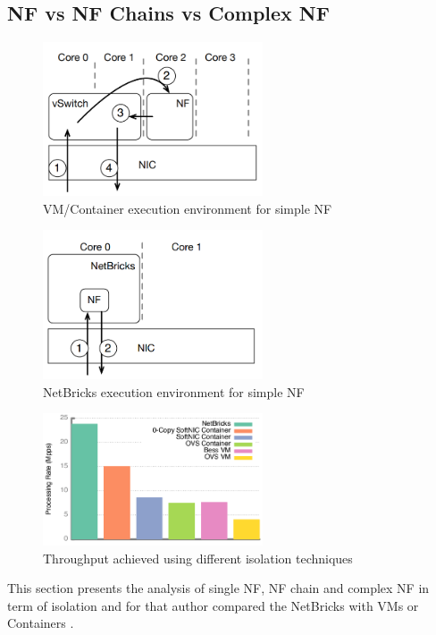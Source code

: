 \documentclass[10pt, a4paper, conference]{IEEEtran}
\begin{document}
\subsection*{NF vs NF Chains vs Complex NF}
\begin{figure}
	\centering
	\includegraphics[width=65mm]{figures/fig6}
	\caption{VM/Container execution environment for simple NF\cite{Panda2016}}
	
	\label{key8}
\end{figure}
\begin{figure}
	\centering
	\includegraphics[width=65mm]{figures/fig7}
	\caption{NetBricks execution environment for simple NF\cite{Panda2016}}
	
	\label{key9}
\end{figure}
\begin{figure}
	\centering
	\includegraphics[width=65mm]{figures/fig8}
	\caption{Throughput achieved using different isolation techniques\cite{Panda2016}}
	
	\label{key10}
\end{figure}
This section presents the analysis of single NF, NF chain and complex NF in term of isolation and for that author compared the NetBricks with VMs or Containers \cite{Panda2016}. 
\end{document}

